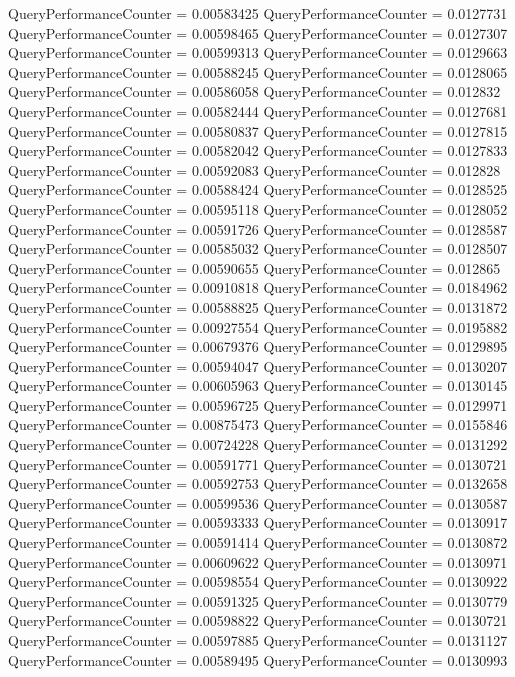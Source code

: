 \documentclass[9pt]{article}
\theoremstyle{plain}
\theoremstyle{definition}
\theoremstyle{remark}
\numberwithin{equation}{section}
\begin{document}
QueryPerformanceCounter  =  0.00583425
QueryPerformanceCounter  =  0.0127731
QueryPerformanceCounter  =  0.00598465
QueryPerformanceCounter  =  0.0127307
QueryPerformanceCounter  =  0.00599313
QueryPerformanceCounter  =  0.0129663
QueryPerformanceCounter  =  0.00588245
QueryPerformanceCounter  =  0.0128065
QueryPerformanceCounter  =  0.00586058
QueryPerformanceCounter  =  0.012832
QueryPerformanceCounter  =  0.00582444
QueryPerformanceCounter  =  0.0127681
QueryPerformanceCounter  =  0.00580837
QueryPerformanceCounter  =  0.0127815
QueryPerformanceCounter  =  0.00582042
QueryPerformanceCounter  =  0.0127833
QueryPerformanceCounter  =  0.00592083
QueryPerformanceCounter  =  0.012828
QueryPerformanceCounter  =  0.00588424
QueryPerformanceCounter  =  0.0128525
QueryPerformanceCounter  =  0.00595118
QueryPerformanceCounter  =  0.0128052
QueryPerformanceCounter  =  0.00591726
QueryPerformanceCounter  =  0.0128587
QueryPerformanceCounter  =  0.00585032
QueryPerformanceCounter  =  0.0128507
QueryPerformanceCounter  =  0.00590655
QueryPerformanceCounter  =  0.012865
QueryPerformanceCounter  =  0.00910818
QueryPerformanceCounter  =  0.0184962
QueryPerformanceCounter  =  0.00588825
QueryPerformanceCounter  =  0.0131872
QueryPerformanceCounter  =  0.00927554
QueryPerformanceCounter  =  0.0195882
QueryPerformanceCounter  =  0.00679376
QueryPerformanceCounter  =  0.0129895
QueryPerformanceCounter  =  0.00594047
QueryPerformanceCounter  =  0.0130207
QueryPerformanceCounter  =  0.00605963
QueryPerformanceCounter  =  0.0130145
QueryPerformanceCounter  =  0.00596725
QueryPerformanceCounter  =  0.0129971
QueryPerformanceCounter  =  0.00875473
QueryPerformanceCounter  =  0.0155846
QueryPerformanceCounter  =  0.00724228
QueryPerformanceCounter  =  0.0131292
QueryPerformanceCounter  =  0.00591771
QueryPerformanceCounter  =  0.0130721
QueryPerformanceCounter  =  0.00592753
QueryPerformanceCounter  =  0.0132658
QueryPerformanceCounter  =  0.00599536
QueryPerformanceCounter  =  0.0130587
QueryPerformanceCounter  =  0.00593333
QueryPerformanceCounter  =  0.0130917
QueryPerformanceCounter  =  0.00591414
QueryPerformanceCounter  =  0.0130872
QueryPerformanceCounter  =  0.00609622
QueryPerformanceCounter  =  0.0130971
QueryPerformanceCounter  =  0.00598554
QueryPerformanceCounter  =  0.0130922
QueryPerformanceCounter  =  0.00591325
QueryPerformanceCounter  =  0.0130779
QueryPerformanceCounter  =  0.00598822
QueryPerformanceCounter  =  0.0130721
QueryPerformanceCounter  =  0.00597885
QueryPerformanceCounter  =  0.0131127
QueryPerformanceCounter  =  0.00589495
QueryPerformanceCounter  =  0.0130993
\end{document}
